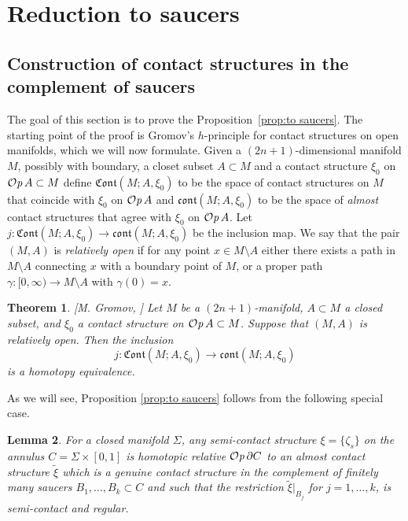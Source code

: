 \documentclass[12pt]{paper}
\theoremstyle{plain}
\newtheorem{theorem}{Theorem}[section]
\newtheorem{lemma}[theorem]{Lemma}
\theoremstyle{definition}
\newcommand{\wt}{\widetilde}
\newcommand{\p}{\partial}
\newcommand{\Cont}{\mathfrak{Cont}}
\newcommand{\cont}{\mathfrak{cont}}
\def\Op{{\mathcal O}{\it p}\,}
\numberwithin{figure}{section}
\begin{document}
\section{Reduction to saucers}\label{sec:RedSaucers}
     
\subsection{Construction of contact structures in the complement of saucers}\label{sec:to-saucers} 
The goal of this section is to prove the Proposition~\ref{prop:to saucers}.
 The starting point of the proof is  Gromov's $h$-principle for contact structures  on open manifolds, which we will now formulate.
  Given a $(2n+1)$-dimensional manifold  $M$, possibly with boundary, a closet subset  $A\subset M$  and  a  contact structure
  $\xi_0$   on $\Op A\subset M$  define
$\Cont(M;A,\xi_0)$ to be the space of contact structures on $M$ that  coincide with 
$\xi_0$ on $\Op A$ and 
  $\cont(M;A,\xi_0)$ to be the space of {\em almost} contact structures
that agree with $\xi_0$ on $\Op A$. Let 
$j:\Cont(M;A,\xi_0)\to\cont(M;A,\xi_0)$   be  the inclusion map.
We say that the pair $(M,A)$ is {\em relatively open} if for any point $x\in M\setminus A$ either  there   exists a path in $M\setminus A$ connecting $x$ with a boundary point of $M$, or a proper path $\gamma:[0,\infty)\to M\setminus A$ with $\gamma(0)=x$.
 \begin{theorem}\label{thm:Gromov-open}{\rm[M. Gromov, \cite{Gro69,Gr-PDR}]}
 Let $M$ be a $(2n+1)$-manifold,  $A\subset M$ a closed subset, and
  $\xi_0$   a contact structure on  $\Op A\subset M$. 
  Suppose that  $(M,A)$ is relatively open.
  Then the inclusion $$j:\Cont(M;A,\xi_0)\to\cont(M;A,\xi_0)$$ is a homotopy equivalence. 
 \end{theorem}
As we will see, Proposition \ref{prop:to saucers} follows from the following special case.

   \begin{lemma}\label{lm:annuli-to-saucers} For a closed manifold $\Sigma$, any semi-contact structure  $\xi=\{\zeta_s\}$  on the annulus 
    $C=\Sigma\times[0,1]$ is homotopic relative $\Op\p C$ to an almost contact structure $\wt \xi$ which is a genuine contact structure in the complement of   finitely many saucers $B_1,\dots, B_k\subset C$ and such that
    the restriction $\wt\xi|_{B_j}$ for $j=1,\dots, k$, 
     is semi-contact and regular.
    \end{lemma}
    
\end{document}
